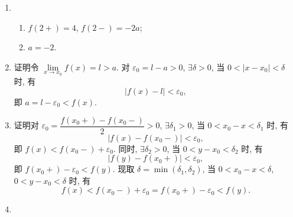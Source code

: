 \begin{enumerate}
\begin{enumerate}[(1)]
                {\heiti 证明}\quad 对 $\forall \varepsilon > 0$, 取 $\delta = \min(1, 30\varepsilon)$, 当 $0 < |x - 3| < \delta$ 时, 有
                \[
                    \left|\frac{x-3}{x^2-9} - \frac16\right| = \left|\frac{1}{x+3} - \frac16\right| = \frac{|x-3|}{6|x+3|} < \frac{|x-3|}{30} < \varepsilon.
                \]
            \item %
                {\heiti 证明}\quad 对 $\forall \varepsilon > 0$, 取 $\delta = \min(1, \varepsilon/11)$, 当 $0 < |x - 1| < \delta$ 时, 有
                \begin{align*}
                    \left| \frac{x^4-1}{x-1} - 4 \right| &= |(x^2+1)(x+1) - 4| = |x^3 + x^2 + x - 3| \\
                                                         &= |x^3 - 1 + x^2 - 1 + x - 1| = |x - 1||x^2 + 2x + 3| < 11|x - 1| < \varepsilon.
                \end{align*}
            \item %
                略.
            \item %
                略.
        \end{enumerate}
    \item %
        \begin{enumerate}[(1)]
            \item %
                $f(2+) = 4$, $f(2-) = -2a$;
            \item %
                $a = -2$.
        \end{enumerate}
    \item %
        {\heiti 证明}\quad 令 $\lim\limits_{x\to x_0}f(x) = l > a$. 对 $\varepsilon_0 = l - a > 0$, $\exists \delta > 0$, 当 $0 < |x - x_0| < \delta$ 时, 有
        \[
            |f(x) - l| < \varepsilon_0,    
        \]
        即 $a = l - \varepsilon_0 < f(x)$.
    \item %
        {\heiti 证明}\quad 对 $\varepsilon_0 = \dfrac{f(x_0+) - f(x_0-)}{2} > 0$, $\exists \delta_1 > 0$, 当 $0 < x_0 - x < \delta_1$ 时, 有
        \[
            |f(x) - f(x_0-)| < \varepsilon_0,    
        \]
        即 $f(x) < f(x_0-) + \varepsilon_0$. 同时, $\exists \delta_2 > 0$, 当 $0 < y - x_0 < \delta_2$ 时, 有
        \[
            |f(y) - f(x_0+)| < \varepsilon_0,    
        \]
        即 $f(x_0+) - \varepsilon_0 < f(y)$. 现取 $\delta = \min(\delta_1, \delta_2)$, 当 $0 < x_0 - x < \delta$, $0 < y - x_0 < \delta$ 时, 有
        \[
            f(x) < f(x_0-) + \varepsilon_0 = f(x_0+) - \varepsilon_0 < f(y).
        \]
    \item %

\end{enumerate}
